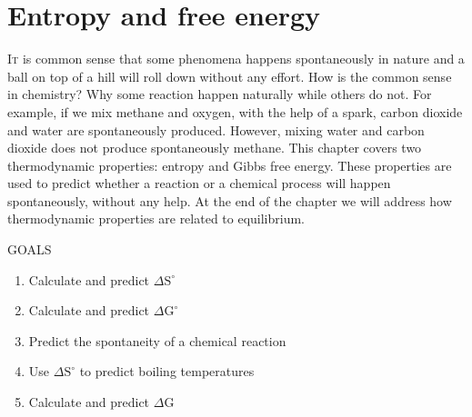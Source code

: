 \documentclass[main.tex]{subfiles}
\begin{document}
\linenumbers
  
\chapter[Entropy and free energy]{Entropy and free energy}


      \begin{marginfigure}
\end{marginfigure}


\lettrine[lines=4]{\color{black!45}I}{t} is common sense that some phenomena happens spontaneously in nature and a ball on top of a hill will roll down without any effort. How is the common sense in chemistry? Why some reaction happen naturally while others do not. For example, if we mix methane and oxygen, with the help of a spark, carbon dioxide and water are spontaneously produced. However, mixing water and carbon dioxide does not produce spontaneously methane. This chapter covers two thermodynamic properties:  entropy and Gibbs free energy. These properties are used to predict whether a reaction or a chemical process will happen spontaneously, without any help. At the end of the chapter we will address how thermodynamic properties are related to equilibrium. 
\begin{marginfigure}%
\begin{mytcbox}{GOALS}
\begin{enumerate}[label=\protect\circled{\color{white}\arabic*}]
\item Calculate and predict $\Delta \text{S}^{\circ}$
\item Calculate and predict $\Delta \text{G}^{\circ}$
\item Predict the spontaneity of a chemical reaction
\item Use $\Delta \text{S}^{\circ}$ to predict boiling temperatures
\item Calculate and predict $\Delta \text{G}$
\end{enumerate}
\end{mytcbox}
\vspace{1cm}
\begin{tcolorbox}[enhanced,colback=red!5!white,colframe=black!50!red,boxrule=1pt,
  arc=0pt,outer arc=0pt,drop heavy lifted shadow]
\faGears\ 
 \discussionTHERMODYN \end{tcolorbox}
\end{marginfigure}%
\end{document}
